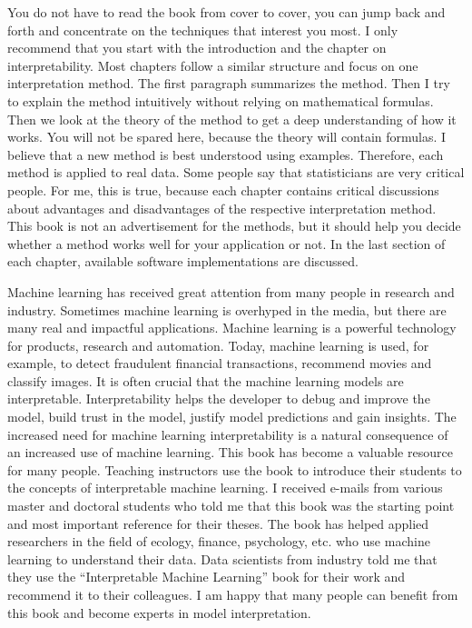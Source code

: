 \documentclass[
  10pt,
]{scrbook}
\begin{document}
You do not have to read the book from cover to cover, you can jump back and forth and concentrate on the techniques that interest you most.
I only recommend that you start with the introduction and the chapter on interpretability.
Most chapters follow a similar structure and focus on one interpretation method.
The first paragraph summarizes the method.
Then I try to explain the method intuitively without relying on mathematical formulas.
Then we look at the theory of the method to get a deep understanding of how it works.
You will not be spared here, because the theory will contain formulas.
I believe that a new method is best understood using examples.
Therefore, each method is applied to real data.
Some people say that statisticians are very critical people.
For me, this is true, because each chapter contains critical discussions about advantages and disadvantages of the respective interpretation method.
This book is not an advertisement for the methods, but it should help you decide whether a method works well for your application or not.
In the last section of each chapter, available software implementations are discussed.

Machine learning has received great attention from many people in research and industry.
Sometimes machine learning is overhyped in the media, but there are many real and impactful applications.
Machine learning is a powerful technology for products, research and automation.
Today, machine learning is used, for example, to detect fraudulent financial transactions, recommend movies and classify images.
It is often crucial that the machine learning models are interpretable.
Interpretability helps the developer to debug and improve the model, build trust in the model, justify model predictions and gain insights.
The increased need for machine learning interpretability is a natural consequence of an increased use of machine learning.
This book has become a valuable resource for many people.
Teaching instructors use the book to introduce their students to the concepts of interpretable machine learning.
I received e-mails from various master and doctoral students who told me that this book was the starting point and most important reference for their theses.
The book has helped applied researchers in the field of ecology, finance, psychology, etc. who use machine learning to understand their data.
Data scientists from industry told me that they use the ``Interpretable Machine Learning'' book for their work and recommend it to their colleagues.
I am happy that many people can benefit from this book and become experts in model interpretation.
\end{document}
